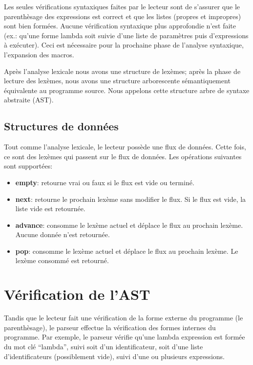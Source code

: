 \documentclass[11pt]{report}
\begin{document}
Les seules vérifications syntaxiques faites par le lecteur sont de s'assurer
que le parenthèsage des expressions est correct et que les listes (propres et
impropres) sont bien formées.  Aucune vérification syntaxique plus approfondie
n'est faite (ex.: qu'une forme lambda soit suivie d'une liste de paramètres
puis d'expressions à exécuter).  Ceci est nécessaire pour la prochaine phase
de l'analyse syntaxique, l'expansion des macros.

Après l'analyse lexicale nous avons une structure de lexèmes; après la phase
de lecture des lexèmes, nous avons une structure arborescente sémantiquement
équivalente au programme source. Nous appelons cette structure arbre de
syntaxe abstraite (AST).

\subsection{Structures de données}

Tout comme l'analyse lexicale, le lecteur possède une flux de
données.  Cette fois, ce sont des lexèmes qui passent sur le flux de
données.  Les opérations suivantes sont supportées:

\begin{itemize}
\item {\bf empty}: retourne vrai ou faux si le flux est vide ou terminé.
\item {\bf next}: retourne le prochain lexème sans modifier le flux.
  Si le flux est vide, la liste vide est retournée.
\item {\bf advance}: consomme le lexème actuel et déplace le flux au
  prochain lexème.  Aucune donnée n'est retournée.
\item {\bf pop}: consomme le lexème actuel et déplace le flux au
  prochain lexème.  Le lexème consommé est retourné.
\end{itemize}

\section{Vérification de l'AST}

Tandis que le lecteur fait une vérification de la forme externe du programme
(le parenthèsage), le parseur effectue la vérification des formes internes du
programme. Par exemple, le parseur vérifie qu'une lambda expression est formée
du mot clé ``lambda'', suivi soit d'un identificateur, soit d'une liste
d'identificateurs (possiblement vide), suivi d'une ou plusieurs expressions.
\end{document}
